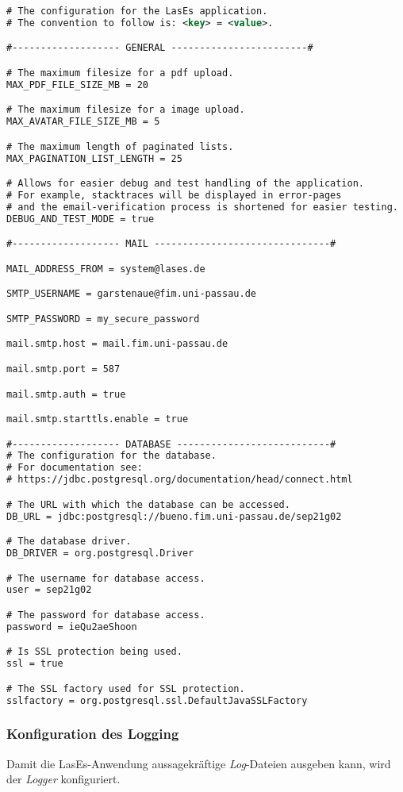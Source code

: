 \begin{lstlisting}[language=XML, caption = Die Anwendungskonfiguration \emph{config.properties}]
# The configuration for the LasEs application.
# The convention to follow is: <key> = <value>.

#------------------- GENERAL ------------------------#

# The maximum filesize for a pdf upload.
MAX_PDF_FILE_SIZE_MB = 20

# The maximum filesize for a image upload.
MAX_AVATAR_FILE_SIZE_MB = 5

# The maximum length of paginated lists.
MAX_PAGINATION_LIST_LENGTH = 25

# Allows for easier debug and test handling of the application.
# For example, stacktraces will be displayed in error-pages
# and the email-verification process is shortened for easier testing.
DEBUG_AND_TEST_MODE = true

#------------------- MAIL -------------------------------#

MAIL_ADDRESS_FROM = system@lases.de

SMTP_USERNAME = garstenaue@fim.uni-passau.de

SMTP_PASSWORD = my_secure_password

mail.smtp.host = mail.fim.uni-passau.de

mail.smtp.port = 587

mail.smtp.auth = true

mail.smtp.starttls.enable = true

#------------------- DATABASE ---------------------------#
# The configuration for the database.
# For documentation see:
# https://jdbc.postgresql.org/documentation/head/connect.html

# The URL with which the database can be accessed.
DB_URL = jdbc:postgresql://bueno.fim.uni-passau.de/sep21g02

# The database driver.
DB_DRIVER = org.postgresql.Driver

# The username for database access.
user = sep21g02

# The password for database access.
password = ieQu2aeShoon

# Is SSL protection being used.
ssl = true

# The SSL factory used for SSL protection.
sslfactory = org.postgresql.ssl.DefaultJavaSSLFactory
\end{lstlisting}


\subsubsection{Konfiguration des Logging}
Damit die LasEs-Anwendung aussagekräftige \emph{Log}-Dateien ausgeben kann,
wird der \emph{Logger} konfiguriert.

